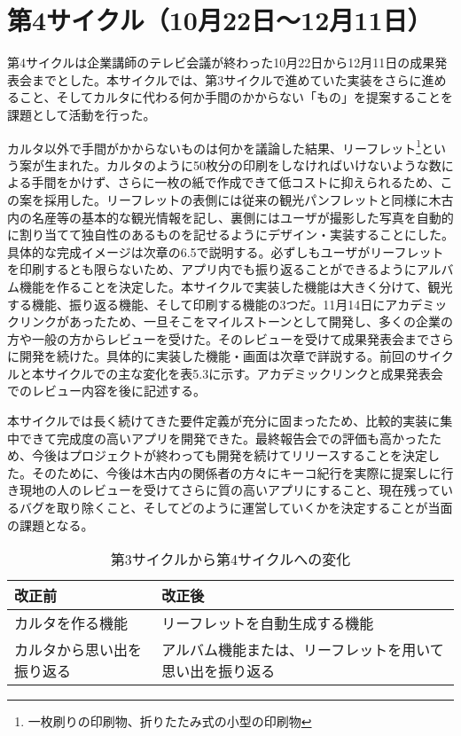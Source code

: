 \section{第4サイクル（10月22日～12月11日）}
第4サイクルは企業講師のテレビ会議が終わった10月22日から12月11日の成果発表会までとした。本サイクルでは、第3サイクルで進めていた実装をさらに進めること、そしてカルタに代わる何か手間のかからない「もの」を提案することを課題として活動を行った。
\par カルタ以外で手間がかからないものは何かを議論した結果、リーフレット\footnote{一枚刷りの印刷物、折りたたみ式の小型の印刷物}という案が生まれた。カルタのように50枚分の印刷をしなければいけないような数による手間をかけず、さらに一枚の紙で作成できて低コストに抑えられるため、この案を採用した。リーフレットの表側には従来の観光パンフレットと同様に木古内の名産等の基本的な観光情報を記し、裏側にはユーザが撮影した写真を自動的に割り当てて独自性のあるものを記せるようにデザイン・実装することにした。具体的な完成イメージは次章の6.5で説明する。必ずしもユーザがリーフレットを印刷するとも限らないため、アプリ内でも振り返ることができるようにアルバム機能を作ることを決定した。本サイクルで実装した機能は大きく分けて、観光する機能、振り返る機能、そして印刷する機能の3つだ。11月14日にアカデミックリンクがあったため、一旦そこをマイルストーンとして開発し、多くの企業の方や一般の方からレビューを受けた。そのレビューを受けて成果発表会までさらに開発を続けた。具体的に実装した機能・画面は次章で詳説する。前回のサイクルと本サイクルでの主な変化を表5.3に示す。アカデミックリンクと成果発表会でのレビュー内容を後に記述する。
\par 本サイクルでは長く続けてきた要件定義が充分に固まったため、比較的実装に集中できて完成度の高いアプリを開発できた。最終報告会での評価も高かったため、今後はプロジェクトが終わっても開発を続けてリリースすることを決定した。そのために、今後は木古内の関係者の方々にキーコ紀行を実際に提案しに行き現地の人のレビューを受けてさらに質の高いアプリにすること、現在残っているバグを取り除くこと、そしてどのように運営していくかを決定することが当面の課題となる。

\begin{table}[htb]
\centering
\addtocounter{table}{+0}
\caption{第3サイクルから第4サイクルへの変化}
  \begin{tabular}{|l|l|} \hline
    改正前&改正後  \\ \hline 
    カルタを作る機能 & \parbox{20zw}{リーフレットを自動生成する機能} \\  \hline
    カルタから思い出を振り返る &\parbox{20zw}{アルバム機能または、リーフレットを用いて思い出を振り返る}\rule[-6mm]{0mm}{14mm}\\ \hline
  \end{tabular} 
\end{table}

